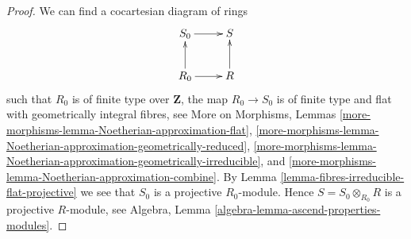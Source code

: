 \documentclass[10pt,a4paper]{amsart}
\theoremstyle{plain}
\theoremstyle{definition}
\theoremstyle{remark}
\numberwithin{equation}{subsection}
\begin{document}
\begin{proof}
We can find a cocartesian diagram of rings
$$
\xymatrix{
S_0 \ar[r] & S \\
R_0 \ar[u] \ar[r] & R \ar[u]
}
$$
such that $R_0$ is of finite type over $\mathbf{Z}$, the map
$R_0 \to S_0$ is of finite type and flat with geometrically integral
fibres, see
More on Morphisms,
Lemmas \ref{more-morphisms-lemma-Noetherian-approximation-flat},
\ref{more-morphisms-lemma-Noetherian-approximation-geometrically-reduced},
\ref{more-morphisms-lemma-Noetherian-approximation-geometrically-irreducible},
and \ref{more-morphisms-lemma-Noetherian-approximation-combine}.
By
Lemma \ref{lemma-fibres-irreducible-flat-projective}
we see that $S_0$ is a projective $R_0$-module. Hence $S = S_0 \otimes_{R_0} R$
is a projective $R$-module, see
Algebra, Lemma \ref{algebra-lemma-ascend-properties-modules}.
\end{proof}
\end{document}

